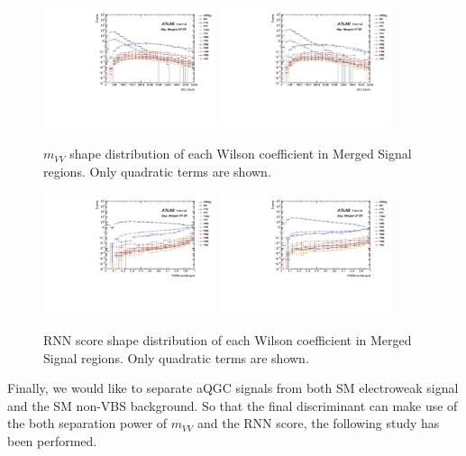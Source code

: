 \begin{figure}[]
    \centering
   \includegraphics[width=0.45\textwidth]{figures/aQGC/MllJ_SR_HP_aQGC.pdf}
   \includegraphics[width=0.45\textwidth]{figures/aQGC/MllJ_SR_LP_aQGC.pdf}
    \caption{$m_{VV}$ shape distribution of each Wilson coefficient in Merged Signal regions. Only quadratic terms are shown.}
    \label{fig:2lepaQGCshapeMVVh}
\end{figure}

\begin{figure}[]
    \centering
   \includegraphics[width=0.45\textwidth]{figures/aQGC/RNNScoreMerged_SR_HP_aQGC.pdf}
   \includegraphics[width=0.45\textwidth]{figures/aQGC/RNNScoreMerged_SR_LP_aQGC.pdf}
    \caption{RNN score shape distribution of each Wilson coefficient in Merged Signal regions. Only quadratic terms are shown.}
    \label{fig:2lepaQGCshapeRNNh}
\end{figure}
Finally, we would like to separate aQGC signals from both SM electroweak signal and the SM non-VBS background.
So that the final discriminant can make use of the both separation power of $m_{VV}$ and the RNN score, the following study has been performed.

